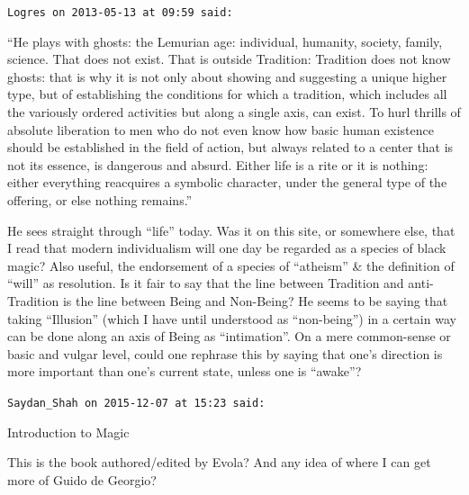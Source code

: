 \begin{footnotesize}
\begin{sffamily}
\texttt{Logres on 2013-05-13 at 09:59 said:}

``He plays with ghosts: the Lemurian age: individual, humanity, society, family, science. That does not exist. That is outside Tradition: Tradition does not know ghosts: that is why it is not only about showing and suggesting a unique higher type, but of establishing the conditions for which a tradition, which includes all the variously ordered activities but along a single axis, can exist. To hurl thrills of absolute liberation to men who do not even know how basic human existence should be established in the field of action, but always related to a center that is not its essence, is dangerous and absurd. Either life is a rite or it is nothing: either everything reacquires a symbolic character, under the general type of the offering, or else nothing remains.''

He sees straight through ``life'' today. Was it on this site, or somewhere else, that I read that modern individualism will one day be regarded as a species of black magic? Also useful, the endorsement of a species of ``atheism'' \& the definition of ``will'' as resolution. Is it fair to say that the line between Tradition and anti-Tradition is the line between Being and Non-Being? He seems to be saying that taking ``Illusion'' (which I have until understood as ``non-being'') in a certain way can be done along an axis of Being as ``intimation''. On a mere common-sense or basic and vulgar level, could one rephrase this by saying that one's direction is more important than one's current state, unless one is ``awake''?

\hfill

\texttt{Saydan\_Shah on 2015-12-07 at 15:23 said:}

Introduction to Magic


This is the book authored/edited by Evola? And any idea of where I can get more of Guido de Georgio?

\end{sffamily}
\end{footnotesize}

